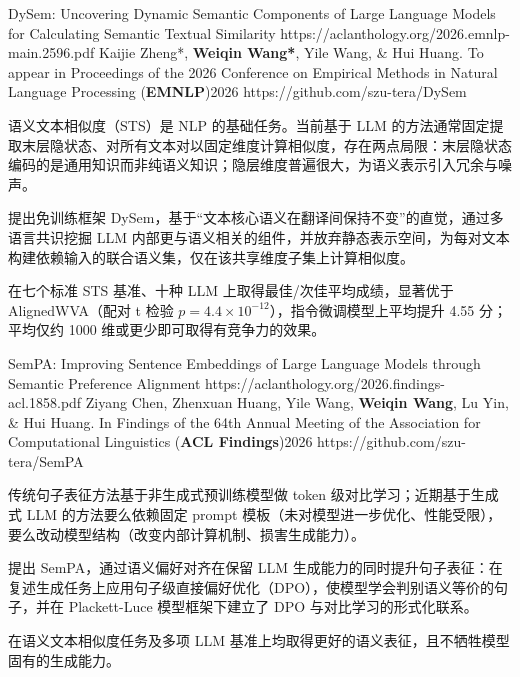 \pub
  {DySem: Uncovering Dynamic Semantic Components of Large Language Models for Calculating Semantic Textual Similarity}
  {https://aclanthology.org/2026.emnlp-main.2596.pdf}
  {Kaijie Zheng*, \textbf{Weiqin Wang*}, Yile Wang, \& Hui Huang.}
  {To appear in Proceedings of the 2026 Conference on Empirical Methods in Natural Language Processing (\textbf{EMNLP})}{2026}
  {https://github.com/szu-tera/DySem}
\begin{pubnotes}
  \item {}语义文本相似度（STS）是 NLP 的基础任务。当前基于 LLM 的方法通常固定提取末层隐状态、对所有文本对以固定维度计算相似度，存在两点局限：末层隐状态编码的是通用知识而非纯语义知识；隐层维度普遍很大，为语义表示引入冗余与噪声。
  \item {}提出免训练框架 DySem，基于“文本核心语义在翻译间保持不变”的直觉，通过多语言共识挖掘 LLM 内部更与语义相关的组件，并放弃静态表示空间，为每对文本构建依赖输入的联合语义集，仅在该共享维度子集上计算相似度。
  \item {}在七个标准 STS 基准、十种 LLM 上取得最佳/次佳平均成绩，显著优于 AlignedWVA（配对 t 检验 $p=4.4\times10^{-12}$），指令微调模型上平均提升 4.55 分；平均仅约 1000 维或更少即可取得有竞争力的效果。
\end{pubnotes}

\pub
  {SemPA: Improving Sentence Embeddings of Large Language Models through Semantic Preference Alignment}
  {https://aclanthology.org/2026.findings-acl.1858.pdf}
  {Ziyang Chen, Zhenxuan Huang, Yile Wang, \textbf{Weiqin Wang}, Lu Yin, \& Hui Huang.}
  {In Findings of the 64th Annual Meeting of the Association for Computational Linguistics (\textbf{ACL Findings})}{2026}
  {https://github.com/szu-tera/SemPA}
\begin{pubnotes}
  \item {}传统句子表征方法基于非生成式预训练模型做 token 级对比学习；近期基于生成式 LLM 的方法要么依赖固定 prompt 模板（未对模型进一步优化、性能受限），要么改动模型结构（改变内部计算机制、损害生成能力）。
  \item {}提出 SemPA，通过语义偏好对齐在保留 LLM 生成能力的同时提升句子表征：在复述生成任务上应用句子级直接偏好优化（DPO），使模型学会判别语义等价的句子，并在 Plackett-Luce 模型框架下建立了 DPO 与对比学习的形式化联系。
  \item {}在语义文本相似度任务及多项 LLM 基准上均取得更好的语义表征，且不牺牲模型固有的生成能力。
\end{pubnotes}

